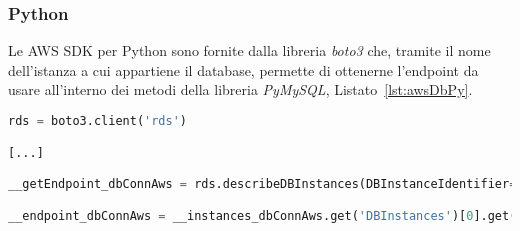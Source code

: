 \subsubsection{Python}
Le AWS SDK per Python sono fornite dalla libreria \textit{boto3} \cite{AwsPySDK} che, tramite il nome dell'istanza a cui appartiene il database, permette di ottenerne l'endpoint da usare all'interno dei metodi della libreria \textit{PyMySQL}, Listato~\ref{lst:awsDbPy}.\\

\begin{lstlisting}[language=Python,caption={Codice Python generato per la variabile di tipo sql su ambiente AWS per ottenere l'endpoint del database.}, label={lst:awsDbPy}]
rds = boto3.client('rds')

[...]

__getEndpoint_dbConnAws = rds.describeDBInstances(DBInstanceIdentifier='nomeIstanza')

__endpoint_dbConnAws = __instances_dbConnAws.get('DBInstances')[0].get('Endpoint').get('Address')
\end{lstlisting}

